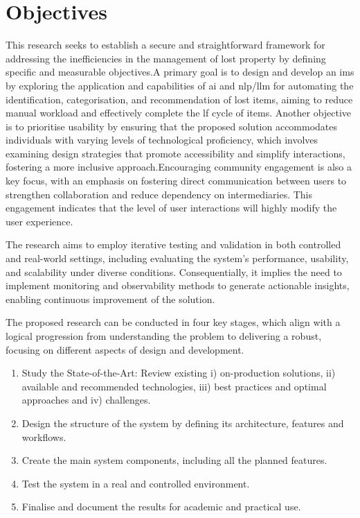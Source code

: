 \section{Objectives} \label{section:objectives}


This research seeks to establish a secure and straightforward framework for addressing the inefficiencies in the management of lost property by defining specific and measurable objectives.A primary goal is to design and develop an \ac{ims} by exploring the application and capabilities of \ac{ai} and \ac{nlp}/\ac{llm} for automating the identification, categorisation, and recommendation of lost items, aiming to reduce manual workload and effectively complete the \ac{lf} cycle of items. Another objective is to prioritise usability by ensuring that the proposed solution accommodates individuals with varying levels of technological proficiency, which involves examining design strategies that promote accessibility and simplify interactions, fostering a more inclusive approach.Encouraging community engagement is also a key focus, with an emphasis on fostering direct communication between users to strengthen collaboration and reduce dependency on intermediaries. This engagement indicates that the level of user interactions will highly modify the user experience.

The research aims to employ iterative testing and validation in both controlled and real-world settings, including evaluating the system's performance, usability, and scalability under diverse conditions. Consequentially, it implies the need to implement monitoring and observability methods to generate actionable insights, enabling continuous improvement of the solution.

The proposed research can be conducted in four key stages, which align with a logical progression from understanding the problem to delivering a robust, focusing on different aspects of design and development.

\begin{enumerate}
    \item Study the State-of-the-Art: Review existing i) on-production solutions, ii) available and recommended technologies, iii) best practices and optimal approaches and iv) challenges.
    \item Design the structure of the system by defining its architecture, features and workflows.
    \item Create the main system components, including all the planned features.
    \item Test the system in a real and controlled environment.
    \item Finalise and document the results for academic and practical use.
\end{enumerate}

